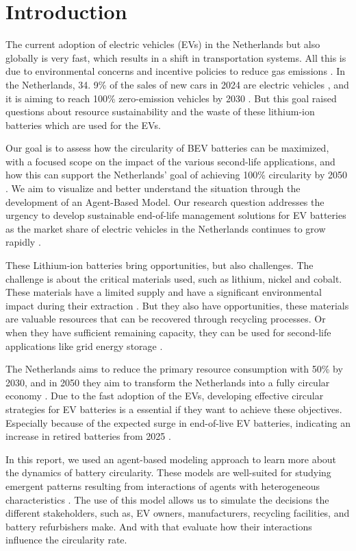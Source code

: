 \section{Introduction}
The current adoption of electric vehicles (EVs) in the Netherlands but also globally is very fast, which results in a shift in transportation systems. All this is due to environmental concerns and incentive policies to reduce gas emissions \cite{IEA2023}. In the Netherlands, 34. 9\% of the sales of new cars in 2024 are electric vehicles \cite{EAFO2025}, and it is aiming to reach 100\% zero-emission vehicles by 2030 \cite{RVO2022}. But this goal raised questions about resource sustainability and the waste of these lithium-ion batteries which are used for the EVs. 

Our goal is to assess how the circularity of BEV batteries can be maximized, with a focused scope on the impact of the various second-life applications, and how this can support the Netherlands' goal of achieving 100\% circularity by 2050 \cite{CircularNetherlands2016}. We aim to visualize and better understand the situation through the development of an Agent-Based Model. Our research question addresses the urgency to develop sustainable end-of-life management solutions for EV batteries as the market share of electric vehicles in the Netherlands continues to grow rapidly \cite{CBS2023Elektrisch}.

These Lithium-ion batteries bring opportunities, but also challenges. The challenge is about the critical materials used, such as lithium, nickel and cobalt. These materials have a limited supply and have a significant environmental impact during their extraction \cite{Olivetti2017}. But they also have opportunities, these materials are valuable resources that can be recovered through recycling processes. Or when they have sufficient remaining capacity, they can be used for second-life applications like grid energy storage \cite{Bobba2018}.

The Netherlands aims to reduce the primary resource consumption with 50\% by 2030, and in 2050 they aim to transform the Netherlands into a fully circular economy \cite{CircularNetherlands2016}. Due to the fast adoption of the EVs, developing effective circular strategies for EV batteries is a essential if they want to achieve these objectives. Especially because of the expected surge in end-of-live EV batteries, indicating an increase in retired batteries from 2025 \cite{Hu2017}.

In this report, we used an agent-based modeling approach to learn more about the dynamics of battery circularity. These models are well-suited for studying emergent patterns resulting from interactions of agents with heterogeneous characteristics \cite{Bonabeau2002}. The use of this model allows us to simulate the decisions the different stakeholders, such as, EV owners, manufacturers, recycling facilities, and battery refurbishers make. And with that evaluate how their interactions influence the circularity rate.

